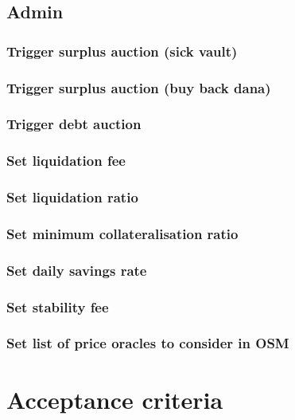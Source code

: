\documentclass{article} %
\begin{document}
\subsection{Admin}

\subsubsection{Trigger surplus auction (sick vault)}

\subsubsection{Trigger surplus auction (buy back dana)}

\subsubsection{Trigger debt auction}

\subsubsection{Set liquidation fee}

\subsubsection{Set liquidation ratio}

\subsubsection{Set minimum collateralisation ratio}

\subsubsection{Set daily savings rate}

\subsubsection{Set stability fee}

\subsubsection{Set list of price oracles to consider in OSM}


\section{Acceptance criteria}
\end{document}
